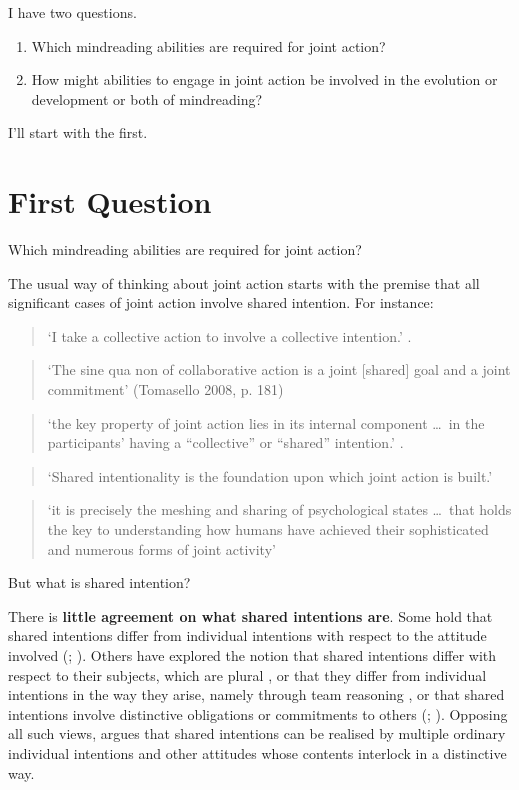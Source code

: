 \documentclass[12pt,a4paper]{extarticle}
\begin{document}
I have two questions.
%
\begin{enumerate}
\item Which mindreading abilities are required for joint action?
\item How might abilities to engage in joint action be involved in the evolution or development or both of mindreading?
\end{enumerate}
%
I'll start with the first.

\section{First Question}
Which mindreading abilities are required for joint action?

The usual way of thinking about joint action starts with the premise that all significant cases of joint action involve shared intention.  For instance:  
%
\begin{quote} 
`I take a collective action to involve a collective intention.'  \citep[p.\ 5]{Gilbert:2006wr}.
\end{quote}
%
\begin{quote} 
`The sine qua non of collaborative action is a joint [shared] goal and a joint commitment’ 
(Tomasello 2008, p. 181)
\end{quote} 
%
%
\begin{quote}
`the key property of joint action lies in its internal component \ldots \ in the participants’ having a ``collective'' or ``shared'' intention.' \citep[pp. 444-5]{alonso_shared_2009}.
\end{quote}
%
\begin{quote}
`Shared intentionality is the foundation upon which joint action is built.' \citep[p.\ 381]{Carpenter:2009wq}
\end{quote}
%
\begin{quote}
`it is precisely the meshing and sharing of psychological states \ldots \ that holds the key to understanding how humans have achieved their sophisticated and numerous forms of joint activity'
\citep[p.\ 369]{Call:2009fk}
\end{quote}

But what is shared intention?

There is \textbf{little agreement on what shared intentions are}. 
Some hold that shared intentions differ from individual intentions with respect to the attitude involved (\citealp{Kutz:2000si}; \citealp{Searle:1990em}). 
Others have explored the notion that shared intentions differ with respect to their subjects, which are plural \citep{Gilbert:1992rs}, 
or that they differ from individual intentions in the way they arise, namely through team reasoning \citep{Gold:2007zd}, 
or that shared intentions involve distinctive obligations or commitments to others (\citealp{Gilbert:1992rs}; \citealp{Roth:2004ki}).
Opposing all such views, \citet{Bratman:1992mi,Bratman:2009lv} argues that shared intentions can be realised by multiple ordinary individual intentions and other attitudes whose contents interlock in a distinctive way. 
\end{document}

